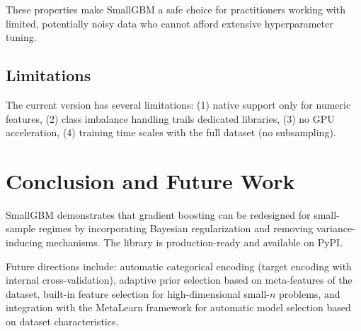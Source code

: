 \documentclass{article}
\begin{document}
These properties make SmallGBM a safe choice for practitioners working with limited, potentially noisy data who cannot afford extensive hyperparameter tuning.

\subsection{Limitations}
The current version has several limitations: (1) native support only for numeric features, (2) class imbalance handling trails dedicated libraries, (3) no GPU acceleration, (4) training time scales with the full dataset (no subsampling).

\section{Conclusion and Future Work}
SmallGBM demonstrates that gradient boosting can be redesigned for small-sample regimes by incorporating Bayesian regularization and removing variance-inducing mechanisms. The library is production-ready and available on PyPI.

Future directions include: automatic categorical encoding (target encoding with internal cross-validation), adaptive prior selection based on meta-features of the dataset, built-in feature selection for high-dimensional small-$n$ problems, and integration with the MetaLearn framework for automatic model selection based on dataset characteristics.



\end{document}
